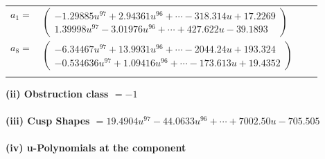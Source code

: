 \documentclass[1p]{elsarticle_modified}
\theoremstyle{definition}
\begin{document}
\begin{tabular}{m{7pt} m{180pt} m{7pt} m{180pt} }
\flushright $a_{1}=$&$\begin{pmatrix}-1.29885 u^{97}+2.94361 u^{96}+\cdots-318.314 u+17.2269\\1.39998 u^{97}-3.01976 u^{96}+\cdots+427.622 u-39.1893\end{pmatrix}$ \\
\flushright $a_{8}=$&$\begin{pmatrix}-6.34467 u^{97}+13.9931 u^{96}+\cdots-2044.24 u+193.324\\-0.534636 u^{97}+1.09416 u^{96}+\cdots-173.613 u+19.4352\end{pmatrix}$\\&\end{tabular}
\flushleft \textbf{(ii) Obstruction class $= -1$}\\~\\
\flushleft \textbf{(iii) Cusp Shapes $= 19.4904 u^{97}-44.0633 u^{96}+\cdots+7002.50 u-705.505$}\\~\\
\newpage\renewcommand{\arraystretch}{1}
\flushleft \textbf{(iv) u-Polynomials at the component}\newline \\
\end{document}

